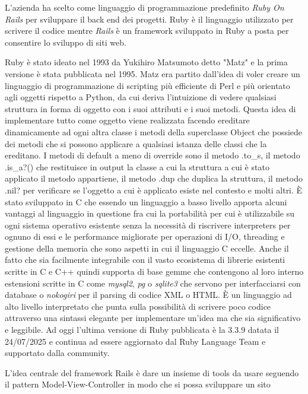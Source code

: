 \documentclass[target=bach,aauheader=,style=]{thud}
\begin{document}
L'azienda ha scelto come linguaggio di programmazione predefinito \textit{Ruby On Rails} \cite{ruby_on_rails} per sviluppare il back end dei progetti.
Ruby è il linguaggio utilizzato per scrivere il codice mentre \textit{Rails} è un framework sviluppato in Ruby a posta per consentire lo sviluppo di siti web.
\par Ruby è stato ideato nel 1993 da Yukihiro Matsumoto detto "Matz" e la prima versione è stata pubblicata nel 1995\cite{ruby_about}.
Matz era partito dall'idea di voler creare un linguaggio di programmazione di scripting più efficiente di Perl e più orientato agli oggetti rispetto a Python,
da cui deriva l'intuizione di vedere qualsiasi struttura in forma di oggetto con i suoi attributi e i suoi metodi.
Questa idea di implementare tutto come oggetto viene realizzata facendo ereditare dinamicamente ad ogni altra classe i metodi della superclasse Object che possiede
dei metodi che si possono applicare a qualsiasi istanza delle classi che la ereditano. I metodi di default a meno di override sono il metodo .to\_s, il metodo .is\_a?() che
restituisce in output la classe a cui la struttura a cui è stato applicato il metodo appartiene, il metodo .dup che duplica la struttura, il metodo .nil? per verificare
se l'oggetto a cui è applicato esiste nel contesto e molti altri.
È stato sviluppato in C che essendo un linguaggio a basso livello apporta alcuni vantaggi al linguaggio in questione fra cui la portabilità per cui è utilizzabile su ogni sistema
operativo esistente senza la necessità di riscrivere interpreters per ognuno di essi e le performance migliorate per operazioni di I/O, threading e gestione della memoria che sono
aspetti in cui il linguaggio C eccelle. Anche il fatto che sia facilmente integrabile con il vasto ecosistema di librerie esistenti scritte in C e C++ quindi supporta
di base gemme che contengono al loro interno estensioni scritte in C come \textit{mysql2}\cite{mysql2_gem}, \textit{pg}\cite{pg_gem} o \textit{sqlite3}\cite{sqlite_home} che servono per
interfacciarsi con database o \textit{nokogiri}\cite{nokogiri_gem} per il parsing di codice XML o HTML.
È un linguaggio ad alto livello interpretato che punta sulla possibilità di scrivere poco codice attraverso una sintassi elegante per implementare un'idea ma che sia significativo
e leggibile. Ad oggi l'ultima versione di Ruby pubblicata è la 3.3.9 datata il 24/07/2025\cite{ruby_releases} e continua ad essere aggiornato dal Ruby Language Team e supportato dalla community.
\par L'idea centrale del framework Rails è dare un insieme di tools da usare seguendo il pattern Model-View-Controller in modo che si possa sviluppare un sito
\end{document}
